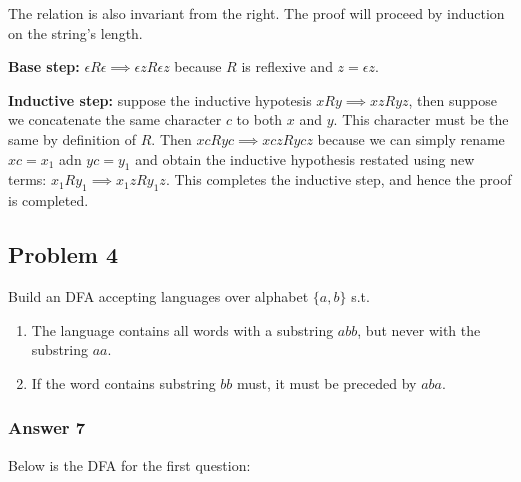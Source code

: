\documentclass[11pt]{article}
\begin{document}
The relation is also invariant from the right.  The proof will proceed
by induction on the string's length.

\textbf{Base step:} \(\epsilon R \epsilon \implies \epsilon z R \epsilon z\) because
\(R\) is reflexive and \(z = \epsilon z\).

\textbf{Inductive step:} suppose the inductive hypotesis \(xRy \implies xzRyz\), then
suppose we concatenate the same character \(c\) to both \(x\) and \(y\).  This
character must be the same by definition of \(R\).  Then \(xcRyc \implies
    xczRycz\) because we can simply rename \(xc = x_1\) adn \(yc = y_1\) and obtain
the inductive hypothesis restated using new terms: \(x_1Ry_1 \implies
    x_1zRy_1z\).  This completes the inductive step, and hence the proof is
completed.

\subsection{Problem 4}
\label{sec:orgheadline12}
Build an DFA accepting languages over alphabet \(\{a, b\}\) s.t.
\begin{enumerate}
\item The language contains all words with a substring \(abb\), but never
with the substring \(aa\).
\item If the word contains substring \(bb\) must, it must be preceded by \(aba\).
\end{enumerate}

\subsubsection{Answer 7}
\label{sec:orgheadline10}
Below is the DFA for the first question:

\end{document}
